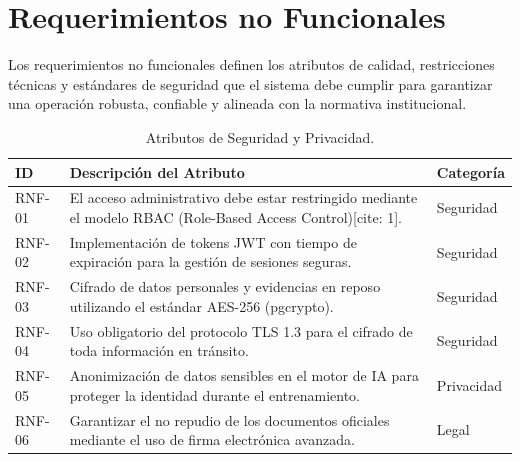 \section{Requerimientos no Funcionales}

Los requerimientos no funcionales definen los atributos de calidad, restricciones técnicas y estándares de seguridad que el sistema debe cumplir para garantizar una operación robusta, confiable y alineada con la normativa institucional.

\begin{table}[h!]
\centering
\scriptsize
\caption{Atributos de Seguridad y Privacidad.}
\label{tab:rnf_seguridad}
\begin{tabular}{@{} l p{9.5cm} l @{}}
\toprule
\rowcolor[HTML]{2D3E50} 
\textbf{\color[HTML]{FFFFFF} ID} & \textbf{\color[HTML]{FFFFFF} Descripción del Atributo} & \textbf{\color[HTML]{FFFFFF} Categoría} \\ \midrule
RNF-01 & El acceso administrativo debe estar restringido mediante el modelo RBAC (Role-Based Access Control)[cite: 1]. & Seguridad \\
\rowcolor[HTML]{F2F4F7} 
RNF-02 & Implementación de tokens JWT con tiempo de expiración para la gestión de sesiones seguras. & Seguridad \\
RNF-03 & Cifrado de datos personales y evidencias en reposo utilizando el estándar AES-256 (pgcrypto). & Seguridad \\
\rowcolor[HTML]{F2F4F7} 
RNF-04 & Uso obligatorio del protocolo TLS 1.3 para el cifrado de toda información en tránsito. & Seguridad \\
RNF-05 & Anonimización de datos sensibles en el motor de IA para proteger la identidad durante el entrenamiento. & Privacidad \\
\rowcolor[HTML]{F2F4F7} 
RNF-06 & Garantizar el no repudio de los documentos oficiales mediante el uso de firma electrónica avanzada. & Legal \\ \bottomrule
\end{tabular}
\end{table}

